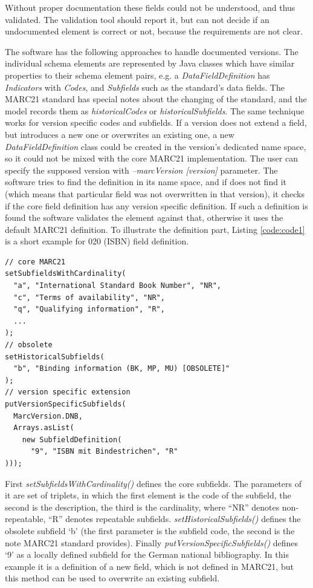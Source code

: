 Without proper documentation these fields could not be understood, and thus validated. The validation tool should report it, but can not decide if an undocumented element is correct or not, because the requirements are not clear.

The software has the following approaches to handle documented versions. The individual schema elements are represented by Java classes which have similar properties to their schema element pairs, e.g. a \emph{DataFieldDefinition} has \emph{Indicators} with \emph{Codes}, and \emph{Subfields} such as the standard's data fields. The MARC21 standard has special notes about the changing of the standard, and the model records them as \emph{historicalCodes} or \emph{historicalSubfields}. The same technique works for version specific codes and subfields. If a version does not extend a field, but introduces a new one or overwrites an existing one, a new \emph{DataFieldDefinition} class could be created in the version's dedicated name space, so it could not be mixed with the core MARC21 implementation. The user can specify the supposed version with \emph{--marcVersion [version]} parameter. The software tries to find the definition in its name space, and if does not find it (which means that particular field was not overwritten in that version), it checks if the core field definition has any version specific definition. If such a definition is found the software validates the element against that, otherwise it uses the default MARC21 definition. To illustrate the definition part, Listing \ref{code:code1} is a short example for 020 (ISBN) field definition.

\lstset{language=Java, basicstyle=\footnotesize\ttfamily}

\begin{lstlisting}[float, caption=Subfield definition in Java, label=code:code1]
// core MARC21
setSubfieldsWithCardinality(
  "a", "International Standard Book Number", "NR",
  "c", "Terms of availability", "NR",
  "q", "Qualifying information", "R",
  ...
);
// obsolete
setHistoricalSubfields(
  "b", "Binding information (BK, MP, MU) [OBSOLETE]"
);
// version specific extension
putVersionSpecificSubfields(
  MarcVersion.DNB,
  Arrays.asList(
    new SubfieldDefinition(
      "9", "ISBN mit Bindestrichen", "R"
)));
\end{lstlisting}

First \emph{setSubfieldsWithCardinality()} defines the core subfields. The parameters of it are set of triplets, in which the first element is the code of the subfield, the second is the description, the third is the cardinality, where ``NR'' denotes non-repeatable, ``R'' denotes repeatable subfields. \emph{setHistoricalSubfields()} defines the obsolete subfield `b' (the first parameter is the subfield code, the second is the note MARC21 standard provides). Finally \emph{putVersionSpecificSubfields()} defines `9' as a locally defined subfield for the German national bibliography. In this example it is a definition of a new field, which is not defined in MARC21, but this method can be used to overwrite an existing subfield.

